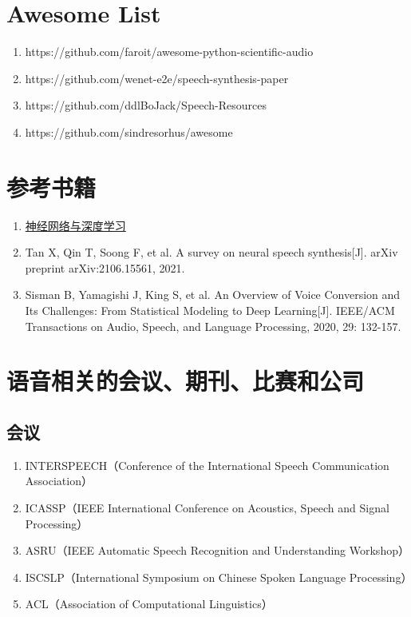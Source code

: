 \documentclass[cn,10pt,math=newtx,citestyle=gb7714-2015,bibstyle=gb7714-2015]{elegantbook}
\begin{document}
\section{Awesome List}
\begin{enumerate}
  \item https://github.com/faroit/awesome-python-scientific-audio
  \item https://github.com/wenet-e2e/speech-synthesis-paper
  \item https://github.com/ddlBoJack/Speech-Resources
  \item https://github.com/sindresorhus/awesome
\end{enumerate}

\section{参考书籍}
\begin{enumerate}
  \item \href{https://nndl.github.io/}{神经网络与深度学习}
  \item Tan X, Qin T, Soong F, et al. A survey on neural speech synthesis[J]. arXiv preprint arXiv:2106.15561, 2021.
  \item Sisman B, Yamagishi J, King S, et al. An Overview of Voice Conversion and Its Challenges: From Statistical Modeling to Deep Learning[J]. IEEE/ACM Transactions on Audio, Speech, and Language Processing, 2020, 29: 132-157.
\end{enumerate}

\section{语音相关的会议、期刊、比赛和公司}
\subsection{会议}
\begin{enumerate}
  \item INTERSPEECH（Conference of the International Speech Communication Association）
  \item ICASSP（IEEE International Conference on Acoustics, Speech and Signal Processing）
  \item ASRU（IEEE Automatic Speech Recognition and Understanding Workshop）
  \item ISCSLP（International Symposium on Chinese Spoken Language Processing）
  \item ACL（Association of Computational Linguistics）
\end{enumerate}
\end{document}
